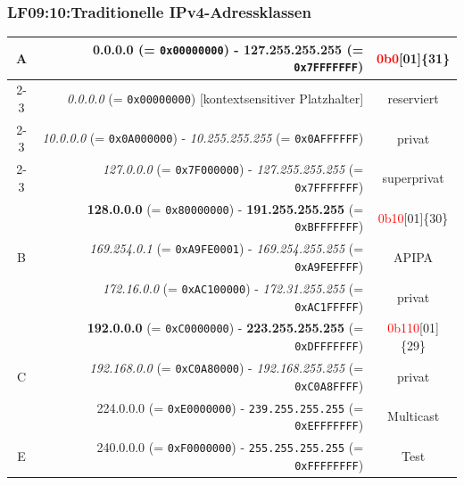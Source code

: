 
\begin{frame}
  \frametitle{LF09:10:Traditionelle IPv4-Adressklassen}

\begin{footnotesize}

  \begin{tabular}{|c|r|c|}
 
  \hline
  \multirow{3}{*}{A} & \textbf{0.0.0.0} (= \texttt{0x00000000}) - \textbf{127.255.255.255} (= \texttt{0x7FFFFFFF}) & \tiny{\textcolor{red}{0b0}[01]\{31\}}\\
    \cline{2-3} 
    & \tiny{\textit{0.0.0.0} (= \texttt{0x00000000})}  [\tiny{kontextsensitiver Platzhalter}]  & \tiny{reserviert}\\
    \cline{2-3} 
    & \tiny{\textit{10.0.0.0} (= \texttt{0x0A000000})} - \tiny{\textit{10.255.255.255} (= \texttt{0x0AFFFFFF})} & \tiny{privat}\\
    \cline{2-3} 
    & \tiny{\textit{127.0.0.0} (= \texttt{0x7F000000})} - \tiny{\textit{127.255.255.255} (= \texttt{0x7FFFFFFF})} & \tiny{superprivat} \\
  \hline
  \multirow{3}{*}{B} & \textbf{128.0.0.0} (= \texttt{0x80000000}) - \textbf{191.255.255.255} (= \texttt{0xBFFFFFFF}) & \tiny{\textcolor{red}{0b10}[01]\{30\}} \\
    \cline{2-3} 
    & \tiny{\textit{169.254.0.1}} (= \texttt{0xA9FE0001}) - \tiny{\textit{169.254.255.255} (= \texttt{0xA9FEFFFF})} & \tiny{APIPA}\\
    \cline{2-3} 
    & \tiny{\textit{172.16.0.0} (= \texttt{0xAC100000})} - \tiny{\textit{172.31.255.255} (= \texttt{0xAC1FFFFF})} & \tiny{privat}\\
  \hline
  \multirow{3}{*}{C} & \textbf{192.0.0.0} (= \texttt{0xC0000000}) - \textbf{223.255.255.255} (= \texttt{0xDFFFFFFF}) & \tiny{\textcolor{red}{0b110}[01]\{29\}} \\
    \cline{2-3} 
    & \tiny{\textit{192.168.0.0}} (= \texttt{0xC0A80000}) - \tiny{\textit{192.168.255.255}} (= \texttt{0xC0A8FFFF}) & \tiny{privat}\\
  \hline
  D & 224.0.0.0 (= \texttt{0xE0000000}) - \texttt{239.255.255.255} (= \texttt{0xEFFFFFFF}) & \tiny{Multicast} \\
  \hline
  E & 240.0.0.0 (= \texttt{0xF0000000}) - \texttt{255.255.255.255} (= \texttt{0xFFFFFFFF}) & \tiny{Test}\\
  \hline
\end{tabular}

\end{footnotesize}

\end{frame}

